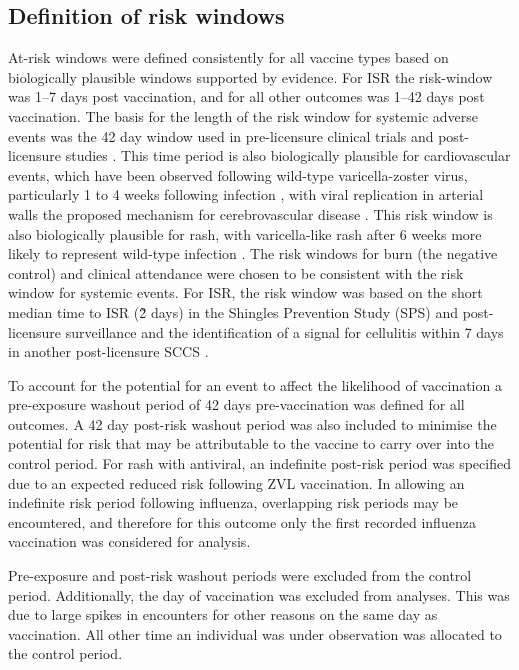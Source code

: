 \documentclass[review, endfloat]{elsarticle}
\begin{document}
\subsection{Definition of risk windows}
\label{sec:risk_windows}

At-risk windows were defined consistently for all vaccine types based on biologically plausible windows supported by evidence. For ISR the risk-window was 1–7 days post vaccination, and for all other outcomes was 1–42 days post vaccination. The basis for the length of the risk window for systemic adverse events was the 42 day window used in pre-licensure clinical trials \citep{oxman2005, schmader2012, murray2011, simberkoff2010} and post-licensure studies \citep{tseng2012,baxter2012}. This time period is also biologically plausible for cardiovascular events, which have been observed following wild-type varicella-zoster virus, particularly 1 to 4 weeks following infection \citep{minassian2015,schink2016}, with viral replication in arterial walls the proposed mechanism for cerebrovascular disease \citep{gilden2009}. This risk window is also biologically plausible for rash, with varicella-like rash after 6 weeks more likely to represent wild-type infection \citep{willis2017herpes}. The risk windows for burn (the negative control) and clinical attendance were chosen to be consistent with the risk window for systemic events. For ISR, the risk window was based on the short median time to ISR (\~2 days) in the Shingles Prevention Study (SPS) and post-licensure surveillance \citep{willis2017herpes,simberkoff2010} and the identification of a signal for cellulitis within 7 days in another post-licensure SCCS \citep{tseng2012}.

To account for the potential for an event to affect the likelihood of vaccination a pre-exposure washout period of 42 days pre-vaccination was defined for all outcomes. A 42 day post-risk washout period was also included to minimise the potential for risk that may be attributable to the vaccine to carry over into the control period.  For rash with antiviral, an indefinite post-risk period was specified due to an expected reduced risk following ZVL vaccination. In allowing an indefinite risk period following influenza, overlapping risk periods may be encountered, and therefore for this outcome only the first recorded influenza vaccination was considered for analysis.

Pre-exposure and post-risk washout periods were excluded from the control period. Additionally, the day of vaccination was excluded from analyses.  This was due to large spikes in encounters for other reasons on the same day as vaccination. All other time an individual was under observation was allocated to the control period.
\end{document}
